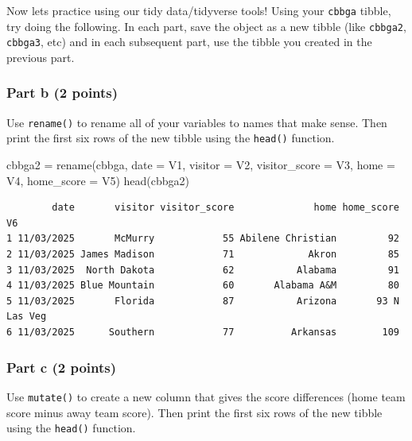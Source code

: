 \documentclass[
  letterpaper,
  DIV=11,
  numbers=noendperiod]{scrartcl}
\newenvironment{Shaded}{\begin{snugshade}}{\end{snugshade}}
\newcommand{\AttributeTok}[1]{\textcolor[rgb]{0.40,0.45,0.13}{#1}}
\newcommand{\FunctionTok}[1]{\textcolor[rgb]{0.28,0.35,0.67}{#1}}
\newcommand{\NormalTok}[1]{\textcolor[rgb]{0.00,0.23,0.31}{#1}}
\newcommand{\OtherTok}[1]{\textcolor[rgb]{0.00,0.23,0.31}{#1}}
\begin{document}
Now lets practice using our tidy data/tidyverse tools! Using your
\texttt{cbbga} tibble, try doing the following. In each part, save the
object as a new tibble (like \texttt{cbbga2}, \texttt{cbbga3}, etc) and
in each subsequent part, use the tibble you created in the previous
part.

\subsubsection{Part b (2 points)}\label{part-b-2-points}

Use \texttt{rename()} to rename all of your variables to names that make
sense. Then print the first six rows of the new tibble using the
\texttt{head()} function.

\begin{Shaded}
\begin{Highlighting}[]
\NormalTok{cbbga2 }\OtherTok{=} \FunctionTok{rename}\NormalTok{(cbbga, }\AttributeTok{date =}\NormalTok{ V1, }\AttributeTok{visitor =}\NormalTok{ V2, }\AttributeTok{visitor\_score =}\NormalTok{ V3, }\AttributeTok{home =}\NormalTok{ V4, }\AttributeTok{home\_score =}\NormalTok{ V5)}
\FunctionTok{head}\NormalTok{(cbbga2)}
\end{Highlighting}
\end{Shaded}

\begin{verbatim}
        date       visitor visitor_score              home home_score      V6
1 11/03/2025       McMurry            55 Abilene Christian         92        
2 11/03/2025 James Madison            71             Akron         85        
3 11/03/2025  North Dakota            62           Alabama         91        
4 11/03/2025 Blue Mountain            60       Alabama A&M         80        
5 11/03/2025       Florida            87           Arizona       93 N Las Veg
6 11/03/2025      Southern            77          Arkansas        109        
\end{verbatim}

\subsubsection{Part c (2 points)}\label{part-c-2-points}

Use \texttt{mutate()} to create a new column that gives the score
differences (home team score minus away team score). Then print the
first six rows of the new tibble using the \texttt{head()} function.
\end{document}
